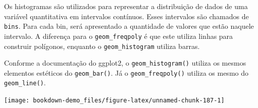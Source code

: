\documentclass[]{book}
\newenvironment{Shaded}{\begin{snugshade}}{\end{snugshade}}
\newcommand{\KeywordTok}[1]{\textcolor[rgb]{0.13,0.29,0.53}{\textbf{#1}}}
\newcommand{\DataTypeTok}[1]{\textcolor[rgb]{0.13,0.29,0.53}{#1}}
\newcommand{\DecValTok}[1]{\textcolor[rgb]{0.00,0.00,0.81}{#1}}
\newcommand{\StringTok}[1]{\textcolor[rgb]{0.31,0.60,0.02}{#1}}
\newcommand{\OperatorTok}[1]{\textcolor[rgb]{0.81,0.36,0.00}{\textbf{#1}}}
\newcommand{\NormalTok}[1]{#1}
\begin{document}
Os histogramas são utilizados para representar a distribuição de dados
de uma variável quantitativa em intervalos contínuos. Esses intervalos
são chamados de \texttt{bins}. Para cada bin, será apresentado a
quantidade de valores que estão naquele intervalo. A diferença para o
\texttt{geom\_freqpoly} é que este utiliza linhas para construir
polígonos, enquanto o \texttt{geom\_histogram} utiliza barras.

Conforme a documentação do ggplot2, o \texttt{geom\_histogram()} utiliza
os mesmos elementos estéticos do \texttt{geom\_bar()}. Já o
\texttt{geom\_freqpoly()} utiliza os mesmo do \texttt{geom\_line()}.

\begin{Shaded}
\end{Shaded}

\begin{center}\texttt{[image: bookdown-demo\_files/figure-latex/unnamed-chunk-187-1]} \end{center}

\begin{Shaded}
\end{Shaded}
\end{document}
